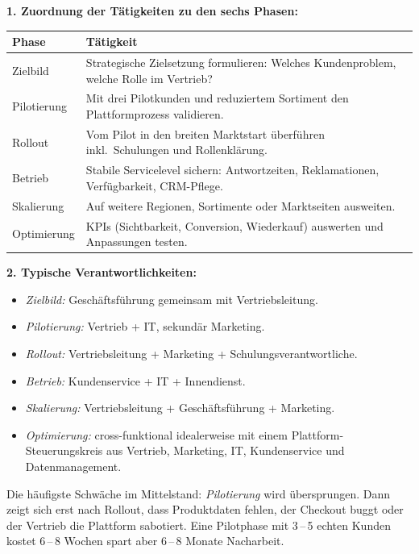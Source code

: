 \documentclass[11pt,a4paper,oneside]{article}
\begin{document}
\begin{loesungbox}
\textbf{1. Zuordnung der Tätigkeiten zu den sechs Phasen:}

\smallskip
\begin{tabularx}{\linewidth}{@{}lX@{}}
\toprule
\textbf{Phase} & \textbf{Tätigkeit} \\
\midrule
Zielbild       & Strategische Zielsetzung formulieren: Welches Kundenproblem, welche Rolle im Vertrieb? \\
\midrule
Pilotierung    & Mit drei Pilotkunden und reduziertem Sortiment den Plattformprozess validieren. \\
\midrule
Rollout        & Vom Pilot in den breiten Marktstart überführen \textendash{} inkl.\ Schulungen und Rollenklärung. \\
\midrule
Betrieb        & Stabile Servicelevel sichern: Antwortzeiten, Reklamationen, Verfügbarkeit, CRM-Pflege. \\
\midrule
Skalierung     & Auf weitere Regionen, Sortimente oder Marktseiten ausweiten. \\
\midrule
Optimierung    & KPIs (Sichtbarkeit, Conversion, Wiederkauf) auswerten und Anpassungen testen. \\
\bottomrule
\end{tabularx}

\smallskip
\textbf{2. Typische Verantwortlichkeiten:}
\begin{itemize}
  \item \emph{Zielbild:} Geschäftsführung gemeinsam mit Vertriebsleitung.
  \item \emph{Pilotierung:} Vertrieb + IT, sekundär Marketing.
  \item \emph{Rollout:} Vertriebsleitung + Marketing + Schulungsverantwortliche.
  \item \emph{Betrieb:} Kundenservice + IT + Innendienst.
  \item \emph{Skalierung:} Vertriebsleitung + Geschäftsführung + Marketing.
  \item \emph{Optimierung:} cross-funktional \textendash{} idealerweise mit einem Plattform-Steuerungskreis aus Vertrieb, Marketing, IT, Kundenservice und Datenmanagement.
\end{itemize}

\begin{merkbox}[Managementhinweis]
Die häufigste Schwäche im Mittelstand: \emph{Pilotierung} wird übersprungen. Dann zeigt sich erst nach Rollout, dass Produktdaten fehlen, der Checkout buggt oder der Vertrieb die Plattform sabotiert. Eine Pilotphase mit 3\,--\,5 echten Kunden kostet 6\,--\,8 Wochen \textendash{} spart aber 6\,--\,8 Monate Nacharbeit.
\end{merkbox}
\end{loesungbox}
\end{document}
